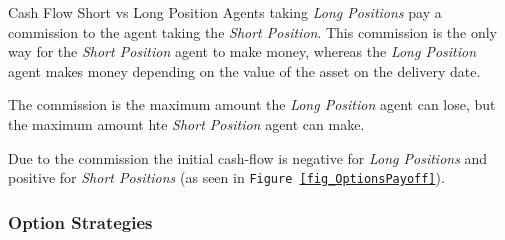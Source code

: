 \documentclass[11pt,a4paper]{article}
\begin{document}
  \begin{remark}{Cash Flow Short vs Long Position}
    Agents taking \textit{Long Positions} pay a commission to the agent taking the \textit{Short Position}. This commission is the only way for the \textit{Short Position} agent to make money, whereas the \textit{Long Position} agent makes money depending on the value of the asset on the delivery date.
    \par The commission is the maximum amount the \textit{Long Position} agent can lose, but the maximum amount hte \textit{Short Position} agent can make.
    \par Due to the commission the initial cash-flow is negative for \textit{Long Positions} and positive for \textit{Short Positions} (as seen in \texttt{Figure \ref{fig_OptionsPayoff}}).
  \end{remark}

\subsubsection{Option Strategies} \label{sec_OptionStrategies}
\end{document}

